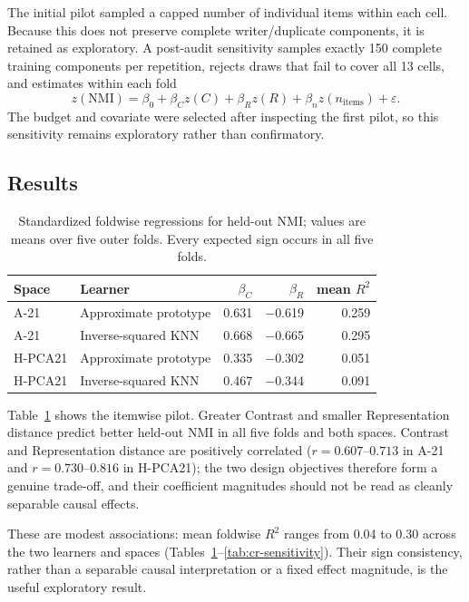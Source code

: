 \documentclass[11pt]{article}
\begin{document}
The initial pilot sampled a capped number of individual items within each cell. Because this does not preserve complete writer/duplicate components, it is retained as exploratory. A post-audit sensitivity samples exactly 150 complete training components per repetition, rejects draws that fail to cover all 13 cells, and estimates within each fold
\[
  z(\mathrm{NMI})=\beta_0+\beta_C z(C)+\beta_R z(R)
  +\beta_n z(n_{\mathrm{items}})+\varepsilon.
\]
The budget and covariate were selected after inspecting the first pilot, so this sensitivity remains exploratory rather than confirmatory.

\subsection{Results}

\begin{table}[ht]
\centering\footnotesize
\caption{Standardized foldwise regressions for held-out NMI; values are means over five outer folds. Every expected sign occurs in all five folds.}
\label{tab:cr-pilot}
\begin{tabular}{llrrr}
\toprule
Space & Learner & $\beta_C$ & $\beta_R$ & mean $R^2$\\
\midrule
A-21 & Approximate prototype & 0.631 & $-$0.619 & 0.259\\
A-21 & Inverse-squared KNN    & 0.668 & $-$0.665 & 0.295\\
H-PCA21 & Approximate prototype & 0.335 & $-$0.302 & 0.051\\
H-PCA21 & Inverse-squared KNN    & 0.467 & $-$0.344 & 0.091\\
\bottomrule
\end{tabular}
\end{table}

Table~\ref{tab:cr-pilot} shows the itemwise pilot. Greater Contrast and smaller Representation distance predict better held-out NMI in all five folds and both spaces. Contrast and Representation distance are positively correlated ($r=0.607$--$0.713$ in A-21 and $r=0.730$--$0.816$ in H-PCA21); the two design objectives therefore form a genuine trade-off, and their coefficient magnitudes should not be read as cleanly separable causal effects.

These are modest associations: mean foldwise $R^2$ ranges from 0.04 to 0.30 across the two learners and spaces (Tables~\ref{tab:cr-pilot}--\ref{tab:cr-sensitivity}). Their sign consistency, rather than a separable causal interpretation or a fixed effect magnitude, is the useful exploratory result.
\end{document}
